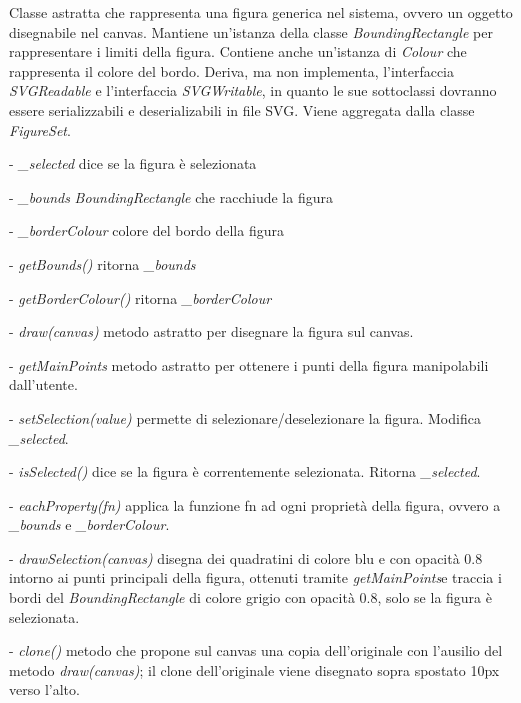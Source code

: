 Classe astratta che rappresenta una figura generica nel sistema, ovvero un oggetto disegnabile nel canvas.
Mantiene un'istanza della classe \textit{BoundingRectangle} per rappresentare i limiti della figura. Contiene anche un'istanza di \textit{Colour} che rappresenta il colore del bordo. Deriva, ma non implementa, l'interfaccia \textit{SVGReadable} e l'interfaccia \textit{SVGWritable}, in quanto le sue sottoclassi dovranno essere serializzabili e deserializabili in file SVG.
Viene aggregata dalla classe \textit{FigureSet}.
\begin{elencopuntato}[\normindent]
\item[-] \textit{{\_}selected} dice se la figura \`e selezionata
\item[-] \textit{{\_}bounds} \textit{BoundingRectangle} che racchiude la figura
\item[-] \textit{{\_}borderColour} colore del bordo della figura
\end{elencopuntato}
\begin{elencopuntato}[\normindent]
\item[-] \textit{getBounds()} ritorna \textit{{\_}bounds}
\item[-] \textit{getBorderColour()} ritorna \textit{{\_}borderColour}
\item[-]  \textit{draw(canvas)} metodo astratto per disegnare la figura sul canvas.
\item[-]  \textit{getMainPoints} metodo astratto per ottenere i punti della figura manipolabili dall'utente.
\item[-]  \textit{setSelection(value)} permette di selezionare/deselezionare la figura. Modifica \textit{{\_}selected}.
\item[-]  \textit{isSelected()} dice se la figura \`e correntemente selezionata. Ritorna \textit{{\_}selected}.
\item[-]  \textit{eachProperty(fn)} applica la funzione fn ad ogni propriet\`a della figura, ovvero a \textit{{\_}bounds} e \textit{{\_}borderColour}.
\item[-] \textit{drawSelection(canvas)} disegna dei quadratini di colore blu e con opacit\`a 0.8 intorno ai punti principali della figura, ottenuti tramite \textit{getMainPoints}e traccia i bordi del \textit{BoundingRectangle} di colore grigio con opacit\`a 0.8, solo se la figura \`e selezionata. 
\item[-] \textit{clone()} metodo che propone sul canvas una copia dell'originale con l'ausilio del metodo \textit{draw(canvas)}; il clone dell'originale viene disegnato sopra spostato 10px verso l'alto.  
\end{elencopuntato}

